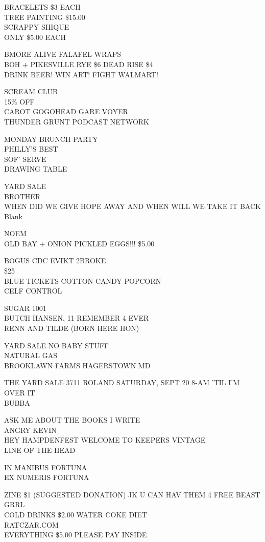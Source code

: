 \documentclass[10pt,letterpaper]{article}
\begin{document}
BRACELETS \$3 EACH\\
TREE PAINTING \$15.00\\
SCRAPPY SHIQUE\\
ONLY \$5.00 EACH

BMORE ALIVE FALAFEL WRAPS\\
BOH + PIKESVILLE RYE \$6 DEAD RISE \$4\\
DRINK BEER! WIN ART! FIGHT WALMART!

SCREAM CLUB\\
15\% OFF\\
CAROT GOGOHEAD GARE VOYER\\
THUNDER GRUNT PODCAST NETWORK

MONDAY BRUNCH PARTY\\
PHILLY'S BEST\\
SOF' SERVE\\
DRAWING TABLE

YARD SALE\\
BROTHER\\
WHEN DID WE GIVE HOPE AWAY AND WHEN WILL WE TAKE IT BACK\\
Blank

NOEM\\
OLD BAY + ONION PICKLED EGGS!!! \$5.00

BOGUS CDC EVIKT 2BROKE\\
\$25\\
BLUE TICKETS COTTON CANDY POPCORN\\
CELF CONTROL

SUGAR 1001\\
BUTCH HANSEN, 11 REMEMBER 4 EVER\\
RENN AND TILDE (BORN HERE HON)

YARD SALE NO BABY STUFF\\
NATURAL GAS\\
BROOKLAWN FARMS HAGERSTOWN MD

THE YARD SALE 3711 ROLAND SATURDAY, SEPT 20 8{-}AM 'TIL I'M OVER IT\\
BUBBA

ASK ME ABOUT THE BOOKS I WRITE\\
ANGRY KEVIN\\
HEY HAMPDENFEST WELCOME TO KEEPERS VINTAGE\\
LINE OF THE HEAD

IN MANIBUS FORTUNA\\
EX NUMERIS FORTUNA

ZINE \$1 (SUGGESTED DONATION) JK U CAN HAV THEM 4 FREE BEAST GRRL\\
COLD DRINKS \$2.00 WATER COKE DIET\\
RATCZAR.COM\\
EVERYTHING \$5.00 PLEASE PAY INSIDE
\end{document}
